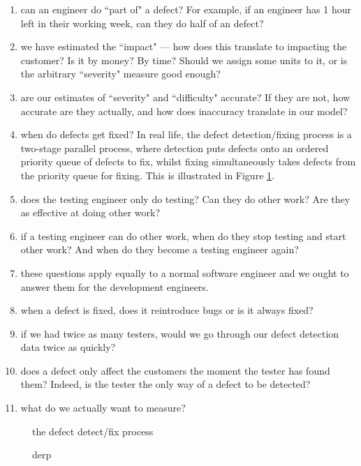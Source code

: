 \begin{enumerate}
	\item can an engineer do ``part of" a defect?
	For example, if an engineer has 1 hour left in their working week, can they do half of an \easy
defect? \label{openQuestOne}
	\item we have estimated the ``impact" --- how does this translate to impacting the customer?
	Is it by money?
	By time?
	Should we assign some units to it, or is the arbitrary ``severity" measure good enough?
	\label{openQuestTwo}
	\item are our estimates of ``severity" and ``difficulty" accurate?
	If they are not, how accurate are they actually, and how does inaccuracy translate in our model?
	\label{openQuestThree}
	\item when do defects get fixed?
	In real life, the defect detection/fixing process is a two-stage parallel process, where detection
puts defects onto an ordered priority queue of defects to fix, whilst fixing simultaneously takes
defects from the priority queue for fixing.
	This is illustrated in Figure \ref{realDefectProcess}. \label{openQuestFour}
	\item does the testing engineer only do testing?
	Can they do other work?
	Are they as effective at doing other work? \label{openQuestFive}
	\item if a testing engineer can do other work, when do they stop testing and start other work?
	And when do they become a testing engineer again? \label{openQuestSix}
	\item these questions apply equally to a normal software engineer and we ought to answer them for
the development engineers. \label{openQuestSeven}
	\item when a defect is fixed, does it reintroduce bugs or is it always fixed?
	\label{openQuestEight}
	\item if we had twice as many testers, would we go through our defect detection data twice as
quickly? \label{openQuestNine}
	\item does a defect only affect the customers the moment the tester has found them?
	Indeed, is the tester the only way of a defect to be detected? \label{openQuestTen}
	\item what do we actually want to measure? \label{openQuestEleven}
\end{enumerate}

\begin{figure}
	\FIXME the defect detect/fix process
	\caption{derp} \label{realDefectProcess}
\end{figure}

